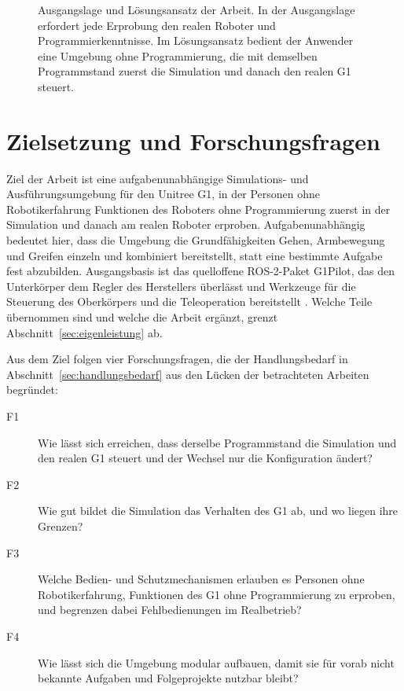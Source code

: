 \begin{figure}[htbp]
  \centering
  
  \caption[Ausgangslage und Lösungsansatz der Arbeit]{Ausgangslage und Lösungsansatz der Arbeit. In der Ausgangslage erfordert jede Erprobung den realen Roboter und Programmierkenntnisse. Im Lösungsansatz bedient der Anwender eine Umgebung ohne Programmierung, die mit demselben Programmstand zuerst die Simulation und danach den realen G1 steuert.}
  \label{fig:einleitung_ansatz}
\end{figure}

\section{Zielsetzung und Forschungsfragen}
\label{sec:zielsetzung}
Ziel der Arbeit ist eine aufgabenunabhängige Simulations- und Ausführungsumgebung für den Unitree G1, in der Personen ohne Robotikerfahrung Funktionen des Roboters ohne Programmierung zuerst in der Simulation und danach am realen Roboter erproben.
Aufgabenunabhängig bedeutet hier, dass die Umgebung die Grundfähigkeiten Gehen, Armbewegung und Greifen einzeln und kombiniert bereitstellt, statt eine bestimmte Aufgabe fest abzubilden.
Ausgangsbasis ist das quelloffene ROS-2-Paket G1Pilot, das den Unterkörper dem Regler des Herstellers überlässt und Werkzeuge für die Steuerung des Oberkörpers und die Teleoperation bereitstellt \cite{HucebotG1Pilot}.
Welche Teile übernommen sind und welche die Arbeit ergänzt, grenzt Abschnitt~\ref{sec:eigenleistung} ab.

Aus dem Ziel folgen vier Forschungsfragen, die der Handlungsbedarf in Abschnitt~\ref{sec:handlungsbedarf} aus den Lücken der betrachteten Arbeiten begründet:
\begin{description}
  \item[F1] Wie lässt sich erreichen, dass derselbe Programmstand die Simulation und den realen G1 steuert und der Wechsel nur die Konfiguration ändert?
  \item[F2] Wie gut bildet die Simulation das Verhalten des G1 ab, und wo liegen ihre Grenzen?
  \item[F3] Welche Bedien- und Schutzmechanismen erlauben es Personen ohne Robotikerfahrung, Funktionen des G1 ohne Programmierung zu erproben, und begrenzen dabei Fehlbedienungen im Realbetrieb?
  \item[F4] Wie lässt sich die Umgebung modular aufbauen, damit sie für vorab nicht bekannte Aufgaben und Folgeprojekte nutzbar bleibt?
\end{description}

